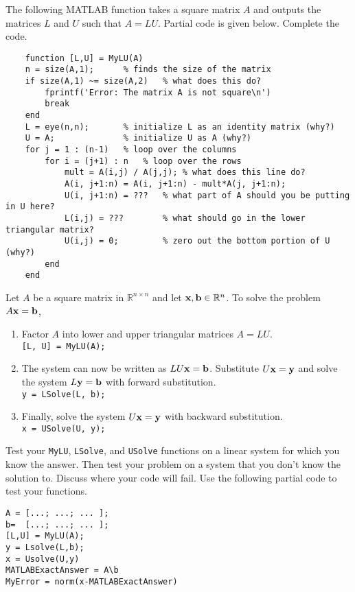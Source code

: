 \begin{technique}[LU Factorization]\label{tech:lu}
    The following MATLAB function takes a square matrix $A$ and
    outputs the matrices $L$ and $U$ such that $A = LU$.  Partial code is given below.
    Complete the code.
    \begin{verbatim}
    function [L,U] = MyLU(A)
    n = size(A,1);      % finds the size of the matrix
    if size(A,1) ~= size(A,2)   % what does this do?
        fprintf('Error: The matrix A is not square\n')
        break
    end
    L = eye(n,n);       % initialize L as an identity matrix (why?)
    U = A;              % initialize U as A (why?)
    for j = 1 : (n-1)   % loop over the columns
        for i = (j+1) : n   % loop over the rows
            mult = A(i,j) / A(j,j); % what does this line do?
            A(i, j+1:n) = A(i, j+1:n) - mult*A(j, j+1:n);
            U(i, j+1:n) = ???   % what part of A should you be putting in U here?
            L(i,j) = ???        % what should go in the lower triangular matrix?
            U(i,j) = 0;         % zero out the bottom portion of U (why?)
        end
    end
    \end{verbatim}
\end{technique}

\begin{thm}
    Let $A$ be a square matrix in $\mathbb{R}^{n \times n}$ and let ${\bf x}, {\bf b} \in
    \mathbb{R}^n$.  To solve the problem $A {\bf x} ={\bf b}$,
    \begin{enumerate}
        \item Factor $A$ into lower and upper triangular matrices $A = LU$.\\
            \verb|[L, U] = MyLU(A);|
        \item The system can now be written as $LU {\bf x} = {\bf b}$.  Substitute $U {\bf x} = {\bf
            y}$ and solve the system $L {\bf y} = {\bf b}$ with forward substitution. \\
            \verb|y = LSolve(L, b);|
        \item Finally, solve the system $U {\bf x} = {\bf y}$ with backward substitution. \\
            \verb|x = USolve(U, y);|
    \end{enumerate}
\end{thm}

\begin{problem}
    Test your \texttt{MyLU}, \texttt{LSolve}, and \texttt{USolve} functions on a linear
    system for which you know the answer.  Then test your problem on a system
    that you don't know the solution to.  Discuss where your code will fail. Use the
    following partial code to test your functions.
\begin{verbatim}
A = [...; ...; ... ];
b=  [...; ...; ... ];
[L,U] = MyLU(A);
y = Lsolve(L,b);
x = Usolve(U,y)
MATLABExactAnswer = A\b
MyError = norm(x-MATLABExactAnswer)
\end{verbatim}
\end{problem}


